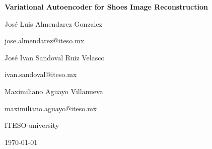 \documentclass[11pt,a4paper]{article}
\begin{document}
\begin{titlepage}
    \centering
    \vspace*{4cm}
    
    {\Huge\bfseries Variational Autoencoder for Shoes Image Reconstruction \par}
    \vspace{1.5cm}
    
    {\Large José Luis Almendarez Gonzalez\par}
    {\large jose.almendarez@iteso.mx\par}
    \vspace*{1em}

    {\Large José Ivan Sandoval Ruiz Velasco\par}
    {\large ivan.sandoval@iteso.mx\par}
    \vspace*{1em}
    
    {\Large Maximiliano Aguayo Villanueva\par}
    {\large maximiliano.aguayo@iteso.mx\par}
    \vspace*{1em}

    \vspace{1cm}
    
    {\large ITESO university\par}
    \vfill
    
    {\large \today\par}
\end{titlepage}

\begin{abstract}
This paper presents the design, implementation, and evaluation of a Convolutional Variational Autoencoder (CVAE) applied to shoe image reconstruction and latent-space generation. The model is trained on a dataset of shoe images collected via web scraping from StockX, resized to $64 \times 64$ pixels, and normalized to $[0,1]$. We investigate the effect of the $\beta$ hyperparameter on the trade-off between reconstruction fidelity and generative quality of the latent space, and additionally incorporate a perceptual loss term computed from a pretrained VGG16 network to improve structural and textural quality of reconstructions. Training is conducted on Apple M2 unified memory using TensorFlow, with a Cosine Decay learning rate schedule. Two dataset configurations are compared: a small set of 177 images and an extended set of 1,220 images. Results show that dataset size does not significantly affect the model's parametrization in terms of reconstruction loss, though it can improve the consistency of latent space representations when exploring latent trajectories. The addition of perceptual loss reduces blurriness in generated images compared to a pure MSE objective. Future work proposes adaptive learning rate schedulers and further dataset expansion to improve generative quality.
\vspace{0.5cm}

\noindent\textbf{Keywords:} Variational Autoencoder, image generation, latent space, perceptual loss, VGG16, shoe dataset, deep learning, TensorFlow
\end{abstract}
\end{document}
